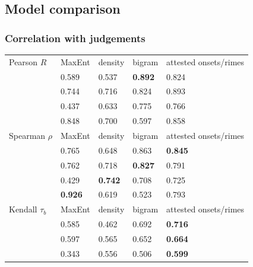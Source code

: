 \subsection{Model comparison}

\subsubsection{Correlation with judgements}

\begin{table}
\centering
\begin{tabular}{l l l l l}
\toprule
Pearson $R$                 & MaxEnt         & density        & bigram         & attested onsets/rimes \\
\citealt{Greenberg1964a} & 0.589          & 0.537          & \textbf{0.892} & 0.824                 \\
\citealt{Scholes1966}    & 0.744          & 0.716          & 0.824          & 0.893                 \\
\citealt{Albright2003a}  & 0.437          & 0.633          & 0.775          & 0.766                 \\
\citealt{Albright2007}   & 0.848          & 0.700          & 0.597          & 0.858                 \\
\bottomrule
Spearman $\rho$             & MaxEnt         & density        & bigram         & attested onsets/rimes \\
\midrule
\citealt{Greenberg1964a} & 0.765          & 0.648          & 0.863          & \textbf{0.845}        \\
\citealt{Scholes1966}    & 0.762          & 0.718          & \textbf{0.827} & 0.791                 \\
\citealt{Albright2003a}  & 0.429          & \textbf{0.742} & 0.708          & 0.725                 \\
\citealt{Albright2007}   & \textbf{0.926} & 0.619          & 0.523          & 0.793                 \\
\bottomrule
Kendall $\tau_b$            & MaxEnt         & density & bigram & attested onsets/rimes                \\
\midrule
\citealt{Greenberg1964a} & 0.585          & 0.462          & 0.692          & \textbf{0.716}        \\
\citealt{Scholes1966}    & 0.597          & 0.565          & 0.652          & \textbf{0.664}        \\
\citealt{Albright2003a}  & 0.343          & 0.556          & 0.506          & \textbf{0.599}        \\

\end{tabular}
\end{table}
